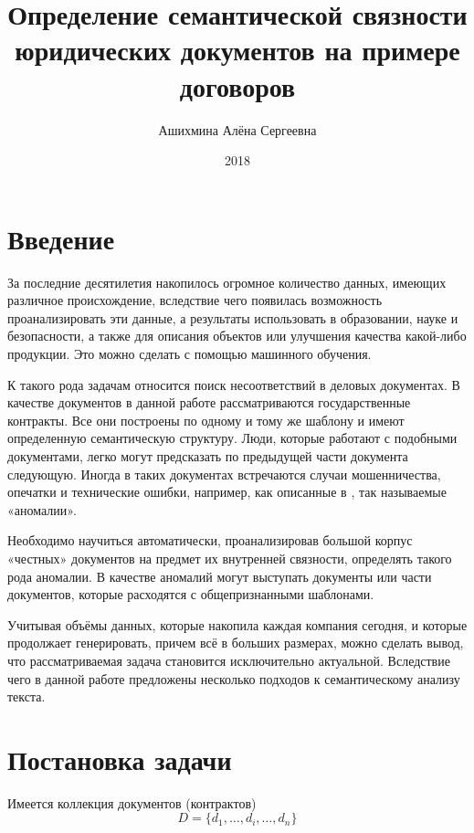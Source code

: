 \documentclass[12pt]{article}
\author{Ашихмина Алёна Сергеевна}
\title{Определение семантической связности юридических документов на примере договоров}
\date{2018}
\begin{document}
\maketitle{}

\topmargin=-1cm
\setlength{\textheight}{20,8cm}
\setlength{\textwidth}{16.5cm}
\hoffset=-5mm
\voffset=10mm
\parindent=12mm

\newpage
\tableofcontents
\newpage


\section*{Введение}
За последние десятилетия накопилось огромное количество данных, имеющих различное происхождение, вследствие чего появилась возможность проанализировать эти данные, а результаты использовать в образовании, науке и безопасности, а также для описания объектов или улучшения качества какой-либо продукции. Это можно сделать с помощью машинного обучения. 

К такого рода задачам относится поиск несоответствий в деловых документах. В качестве документов в данной работе рассматриваются государственные контракты. Все они построены по одному и тому же шаблону и имеют определенную семантическую структуру. Люди, которые работают с подобными документами, легко могут предсказать по предыдущей части документа следующую. Иногда в таких документах встречаются случаи мошенничества, опечатки и технические ошибки, например, как описанные в \cite{vedomosti,fontanka}, так называемые «аномалии». 

Необходимо научиться автоматически, проанализировав большой корпус «честных» документов на предмет их внутренней связности, определять такого рода аномалии. В качестве аномалий могут выступать документы или части документов, которые расходятся с общепризнанными шаблонами.

Учитывая объёмы данных, которые накопила каждая компания сегодня, и которые продолжает генерировать, причем всё в больших размерах, можно сделать вывод, что рассматриваемая задача становится исключительно актуальной. Вследствие чего в данной работе предложены несколько подходов к семантическому анализу текста. 

\newpage
\section*{Постановка задачи}
Имеется коллекция документов (контрактов) $$D = \{d_1,\ldots,d_i,\ldots,d_n\}$$
\end{document}
